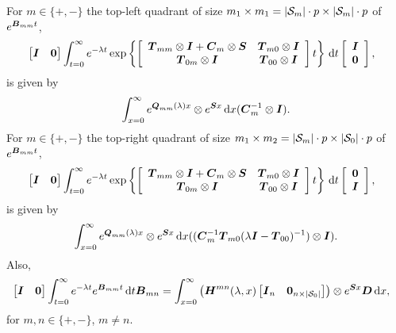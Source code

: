 \begin{cor}\label{cor: mpr B}
	For \(m\in\{+,-\}\) the top-left quadrant of size \(m_1\times m_1=|\mathcal{S}_m|\cdot p \times |\mathcal{S}_m|\cdot p\) of \(e^{\boldsymbol B_{mm}t}\), 
	\begin{align}
		&\begin{bmatrix} \boldsymbol I & \boldsymbol 0 \end{bmatrix}\int_{t=0}^\infty e^{-\lambda t} \exp\left\{\left[\begin{array}{cc} \boldsymbol T_{mm}\otimes \boldsymbol I + \boldsymbol C_m\otimes \boldsymbol S & \boldsymbol T_{m0}\otimes \boldsymbol I \\ \boldsymbol T_{0m} \otimes \boldsymbol I & \boldsymbol T_{00}\otimes \boldsymbol I \end{array}\right]t\right\} \, \mathrm{d} t\left[\begin{array}{c} \boldsymbol I \\ \boldsymbol 0 \end{array}\right], \nonumber
	\end{align}
	is given by 
	\begin{align}
		\int_{x=0}^\infty e^{\boldsymbol Q_{mm} (\lambda)x}\otimes  e^{\boldsymbol S x}\, \mathrm{d} x(\boldsymbol C_m^{-1}\otimes \boldsymbol I).\label{eqn: skagh87} 
	\end{align}
	For \(m\in\{+,-\}\) the top-right quadrant of size \(m_1\times m_2=|\mathcal{S}_m|\cdot p\times |\mathcal{S}_0|\cdot p\) of  \(e^{\boldsymbol B_{mm}t}\), 
	\begin{align}
		&\begin{bmatrix} \boldsymbol I & \boldsymbol 0 \end{bmatrix}\int_{t=0}^\infty e^{-\lambda t} \exp\left\{\left[\begin{array}{cc} \boldsymbol T_{mm}\otimes \boldsymbol I + \boldsymbol C_m\otimes \boldsymbol S & \boldsymbol T_{m0}\otimes \boldsymbol I \\ \boldsymbol T_{0m} \otimes \boldsymbol I & \boldsymbol T_{00}\otimes \boldsymbol I \end{array}\right]t\right\} \, \mathrm{d} t \left[\begin{array}{c}\boldsymbol 0 \\ \boldsymbol I\end{array}\right] ,\nonumber
	\end{align}
	is given by
	\begin{align}
		\int_{x=0}^\infty e^{\boldsymbol Q_{mm}(\lambda)x}\otimes  e^{\boldsymbol S x}\, \mathrm{d} x((\boldsymbol C_m^{-1}\boldsymbol T_{m0}(\lambda \boldsymbol I - \boldsymbol T_{00})^{-1})\otimes \boldsymbol I).\label{eqn: skagh873} 
	\end{align}
	Also, 
	\begin{align}
		&\vligne{\bs I & \bs 0 }\int_{t=0}^\infty e^{-\lambda t} e^{\bs{B}_{mm}t} \wrt t \bs{B}_{m{n}} %
	= \int_{x=0}^\infty \left(\bs H^{mn}(\lambda,x) \vligne{\bs I_n & \bs 0_{n\times |\calS_0|}}\right) \otimes  e^{\bs S x}\bs D\wrt x, \label{eqn: akgj987adKLDJ}
\end{align}
for \(m,n\in\{+,-\}\), \(m\neq n\).
\end{cor}

